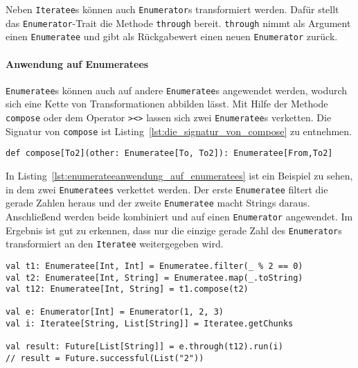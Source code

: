 \documentclass[draft=false
              ,paper=a4
              ,twoside=false
              ,fontsize=11pt
              ,headsepline
              ,BCOR10mm
              ,DIV11
              ]{scrbook}
\begin{document}
Neben \lstinline|Iteratee|s können auch \lstinline|Enumerator|s transformiert werden.
Dafür stellt das \lstinline|Enumerator|-Trait die Methode \lstinline|through| bereit.
\lstinline|through| nimmt als Argument einen \lstinline|Enumeratee| und gibt als Rückgabewert einen neuen \lstinline|Enumerator| zurück.


\paragraph{Anwendung auf Enumeratees} %
\label{par:enumerateeanwendung_auf_enumeratees}\mbox{} %

\lstinline|Enumeratee|s können auch auf andere \lstinline|Enumeratee|s angewendet werden, wodurch sich eine Kette von Transformationen abbilden lässt.
Mit Hilfe der Methode \lstinline|compose| oder dem Operator \lstinline|><>| lassen sich zwei \lstinline|Enumeratee|s verketten.
Die Signatur von \lstinline|compose| ist Listing~\ref{lst:die_signatur_von_compose} zu entnehmen.
\begin{lstlisting}[caption=Die Signatur von compose, label=lst:die_signatur_von_compose]
def compose[To2](other: Enumeratee[To, To2]): Enumeratee[From,To2]
\end{lstlisting}

In Listing~\ref{lst:enumerateeanwendung_auf_enumeratees} ist ein Beispiel zu sehen, in dem zwei \lstinline|Enumeratees| verkettet werden.
Der erste \lstinline|Enumeratee| filtert die gerade Zahlen heraus und der zweite \lstinline|Enumeratee| macht Strings daraus.
Anschließend werden beide kombiniert und auf einen \lstinline|Enumerator| angewendet.
Im Ergebnis ist gut zu erkennen, dass nur die einzige gerade Zahl des \lstinline|Enumerator|s transformiert an den \lstinline|Iteratee| weitergegeben wird.

\begin{lstlisting}[caption=Enumerateeanwendung auf Enumeratees, label=lst:enumerateeanwendung_auf_enumeratees]
val t1: Enumeratee[Int, Int] = Enumeratee.filter(_ % 2 == 0)
val t2: Enumeratee[Int, String] = Enumeratee.map(_.toString)
val t12: Enumeratee[Int, String] = t1.compose(t2)

val e: Enumerator[Int] = Enumerator(1, 2, 3)
val i: Iteratee[String, List[String]] = Iteratee.getChunks

val result: Future[List[String]] = e.through(t12).run(i)
// result = Future.successful(List("2"))
\end{lstlisting}
\end{document}
